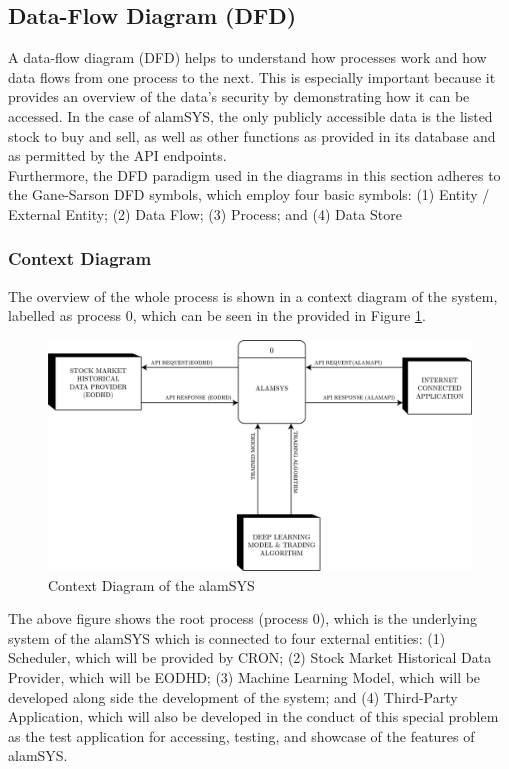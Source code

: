 \subsection{Data-Flow Diagram (DFD)}
\label{subsec:dfd}
A data-flow diagram (DFD) helps to understand how processes work and how data flows 
from one process to the next. This is especially important because it provides an 
overview of the data's security by demonstrating how it can be accessed. 
In the case of alamSYS, the only publicly accessible data is the listed stock to buy and sell, 
as well as other functions as provided in its database and as permitted by the API endpoints.
\hfill \\

Furthermore, the DFD paradigm used in the diagrams in this section adheres to 
the Gane-Sarson DFD symbols, which employ four basic symbols: 
(1) Entity / External Entity; 
(2) Data Flow; 
(3) Process; and 
(4) Data Store 
\cite{VisualParadigm}
\subsubsection{Context Diagram}
\label{subsubsec:context_dfd}
The overview of the whole process is shown in a context diagram of the system,
labelled as process 0, which can be seen in the provided in Figure 
\ref{fig:context_dfd}.
\begin{figure}[ht]
    \centering
    \includegraphics[width=1\textwidth]{./assets/Chapter_3/DFD/DFD_Context.png}
    \caption{Context Diagram of the alamSYS}
    \label{fig:context_dfd}
\end{figure}
\FloatBarrier
\vspace{0.5cm}
The above figure shows the root process (process 0), which is the underlying 
system of the alamSYS which is connected to four external entities: (1) Scheduler, 
which will be provided by CRON; (2) Stock Market Historical Data Provider, 
which will be EODHD; (3) Machine Learning Model, which will be developed 
along side the development of the system; and (4) Third-Party Application, 
which will also be developed in the conduct of this special problem as the 
test application for accessing, testing, and showcase of the features of alamSYS.
\hfill \\

